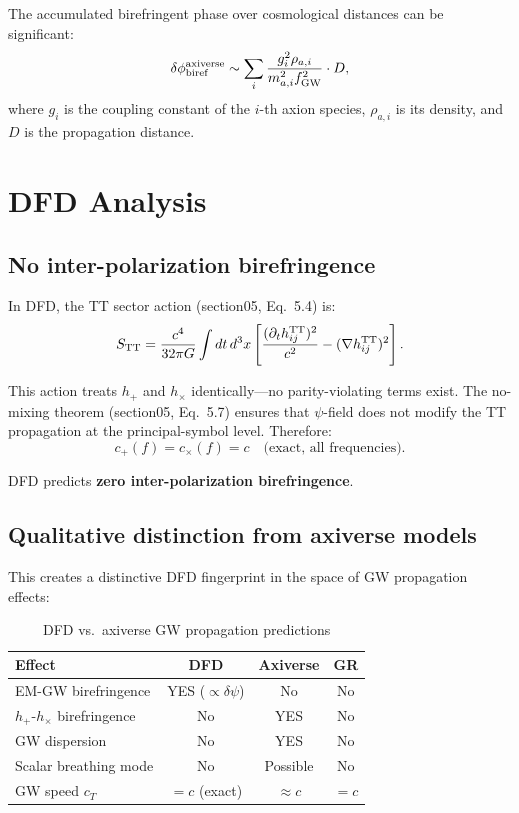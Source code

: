 \documentclass[11pt]{article}
\begin{document}
The accumulated birefringent phase over cosmological distances can
be significant:
\begin{equation}
\delta\phi_{\rm biref}^{\rm axiverse} \sim \sum_i
\frac{g_i^2 \rho_{a,i}}{m_{a,i}^2 f_{\rm GW}^2}\cdot D,
\end{equation}
where $g_i$ is the coupling constant of the $i$-th axion species,
$\rho_{a,i}$ is its density, and $D$ is the propagation distance.

\section{DFD Analysis}

\subsection{No inter-polarization birefringence}

In DFD, the TT sector action (section05, Eq.~5.4) is:
\begin{equation}
S_{\rm TT} = \frac{c^4}{32\pi G}\int dt\,d^3x\left[
\frac{(\partial_t h_{ij}^{\rm TT})^2}{c^2}
- (\nabla h_{ij}^{\rm TT})^2\right].
\end{equation}

This action treats $h_+$ and $h_\times$ identically---no
parity-violating terms exist. The no-mixing theorem (section05,
Eq.~5.7) ensures that $\psi$-field does not modify the TT
propagation at the principal-symbol level. Therefore:
\begin{equation}
c_+(f) = c_\times(f) = c \quad \text{(exact, all frequencies)}.
\end{equation}

DFD predicts \textbf{zero inter-polarization birefringence}.

\subsection{Qualitative distinction from axiverse models}

This creates a distinctive DFD fingerprint in the space of GW
propagation effects:

\begin{table}[H]
\centering
\caption{DFD vs.\ axiverse GW propagation predictions}
\begin{tabular}{lccc}
\toprule
Effect & DFD & Axiverse & GR \\
\midrule
EM-GW birefringence & YES ($\propto \delta\psi$) & No & No \\
$h_+$-$h_\times$ birefringence & No & YES & No \\
GW dispersion & No & YES & No \\
Scalar breathing mode & No & Possible & No \\
GW speed $c_T$ & $= c$ (exact) & $\approx c$ & $= c$ \\
\bottomrule
\end{tabular}
\end{table}
\end{document}
